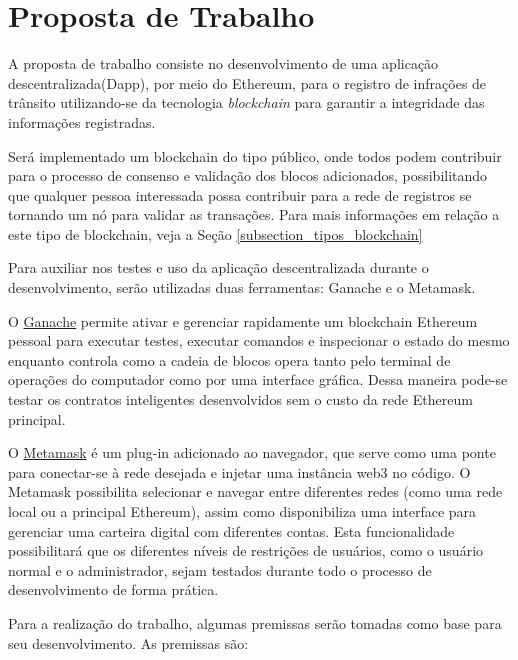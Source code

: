\chapter[Proposta de Trabalho]{Proposta de Trabalho}

A proposta de trabalho consiste no desenvolvimento de uma aplicação descentralizada(Dapp), por meio do Ethereum, para o registro de infrações de trânsito utilizando-se da tecnologia \textit{blockchain} para garantir a integridade das informações registradas. 

Será implementado um blockchain do tipo público, onde todos podem contribuir para o processo de consenso e validação dos blocos adicionados, possibilitando que qualquer pessoa interessada possa contribuir para a rede de registros se tornando um nó para validar as transações. Para mais informações em relação a este tipo de blockchain, veja a Seção \ref{subsection_tipos_blockchain}

Para auxiliar nos testes e uso da aplicação descentralizada durante o desenvolvimento, serão utilizadas duas ferramentas: Ganache e o Metamask. 

O \href{https://www.trufflesuite.com/docs/ganache/quickstart}{Ganache} permite ativar e gerenciar rapidamente um blockchain Ethereum pessoal para executar testes, executar comandos e inspecionar o estado do mesmo enquanto controla como a cadeia de blocos opera tanto pelo terminal de operações do computador como por uma interface gráfica. Dessa maneira pode-se testar os contratos inteligentes desenvolvidos sem o custo da rede Ethereum principal. 

O \href{https://metamask.io/}{Metamask} é um plug-in adicionado ao navegador, que serve como uma ponte para conectar-se à rede desejada e injetar uma instância web3 no código. O Metamask possibilita selecionar e navegar entre diferentes redes (como uma rede local ou a principal Ethereum), assim como disponibiliza uma interface para gerenciar uma carteira digital com diferentes contas. Esta funcionalidade possibilitará que os diferentes níveis de restrições de usuários, como o usuário normal e o administrador, sejam testados durante todo o processo de desenvolvimento de forma prática.




Para a realização do trabalho, algumas premissas serão tomadas como base para seu desenvolvimento. As premissas são:

